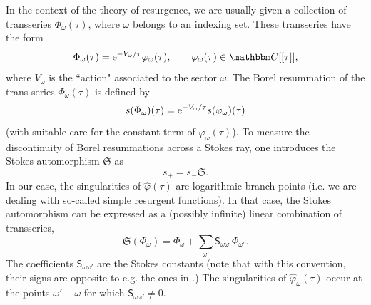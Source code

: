 \documentclass[12pt,reqno]{amsart}
\theoremstyle{definition}
\def\BC{\mathbbm C}
\def\re{{\rm e}}
\begin{document}
In the context of the theory of resurgence, we are usually given a
collection of transseries $\Phi_\omega(\tau)$, where $\omega$ belongs
to an indexing set. These transseries have the form
%
\begin{equation}
  \Phi_\omega(\tau)=\re^{-V_\omega /\tau} \varphi_\omega(\tau),
  \qquad \varphi_\omega(\tau) \in \BC[[\tau]], 
\end{equation}
%
where $V_\omega$ is the ``action" associated to the sector $\omega$.
The Borel resummation of the trans-series $\Phi_\omega (\tau)$ is
defined by
%
\begin{equation}
  s(\Phi_\omega)(\tau) =\re^{-V_\omega /\tau} s(\varphi_\omega)(\tau)
\end{equation}
%
(with suitable care for the constant term of $\varphi_\omega(\tau)$).
To measure the discontinuity of Borel resummations across a Stokes
ray, one introduces the Stokes automorphism $\mathfrak{S}$ as
%
\begin{equation}
  s_+= s_- \mathfrak{S}. 
\end{equation}
%
In our case, the singularities of $\widehat \varphi(\tau)$ are
logarithmic branch points (i.e. we are dealing with so-called simple
resurgent functions).  In that case, the Stokes automorphism can be
expressed as a (possibly infinite) linear combination of transseries,
%
\begin{equation}
  \mathfrak{S} (\Phi_\omega)= \Phi_{\omega}+ \sum_{\omega'}
  \mathsf{S}_{\omega \omega'} \Phi_{\omega'}. 
\end{equation}
%
The coefficients $\mathsf{S}_{\omega \omega'}$ are the Stokes
constants (note that with this convention, their signs are opposite to
e.g. the ones in \cite{abs}.) The singularities of
$\widehat \varphi_\omega(\tau)$ occur at the points $\omega'-\omega$
for which $\mathsf{S}_{\omega \omega'} \not=0$.
\end{document}

